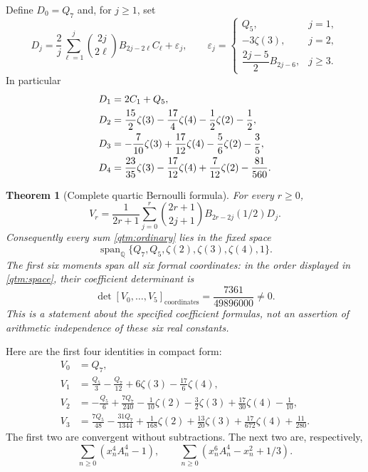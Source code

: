 \documentclass[11pt,a4paper]{article}
\numberwithin{equation}{section}
\theoremstyle{plain}
\newtheorem{theorem}{Theorem}[section]
\theoremstyle{definition}
\theoremstyle{remark}
\begin{document}
Define $D_0=Q_7$ and, for $j\ge1$, set
\begin{equation}\label{qtm:Dj}
 \boxed{\displaystyle
 D_j=\frac2j\sum_{\ell=1}^{j}
 \binom{2j}{2\ell}B_{2j-2\ell}C_\ell+\varepsilon_j,\qquad
 \varepsilon_j=
 \begin{cases}
 Q_5,&j=1,\\
 -3\zeta(3),&j=2,\\
 \dfrac{2j-5}{2}B_{2j-6},&j\ge3.
 \end{cases}}
\end{equation}
In particular
\begin{align}
 D_1&=2C_1+Q_5,\notag\\
 D_2&=\frac{15}{2}\zeta(3)-\frac{17}{4}\zeta(4)
                 -\frac12\zeta(2)-\frac12,\notag\\
 D_3&=-\frac7{10}\zeta(3)+\frac{17}{12}\zeta(4)
                 -\frac56\zeta(2)-\frac35,\notag\\
 D_4&=\frac{23}{35}\zeta(3)-\frac{17}{12}\zeta(4)
                 +\frac7{12}\zeta(2)-\frac{81}{560}.
 \label{qtm:Dexamples}
\end{align}

\begin{theorem}[Complete quartic Bernoulli formula]
\label{qtm:main}
For every $r\ge0$,
\begin{equation}\label{qtm:mainformula}
 \boxed{\displaystyle
 V_r=\frac1{2r+1}\sum_{j=0}^{r}
 \binom{2r+1}{2j+1}B_{2r-2j}(1/2)D_j.}
\end{equation}
Consequently every sum \eqref{qtm:ordinary} lies in the fixed space
\begin{equation}\label{qtm:space}
 \operatorname{span}_{\mathbb Q}
 \{Q_7,Q_5,\zeta(2),\zeta(3),\zeta(4),1\}.
\end{equation}
The first six moments span all six formal coordinates: in the order
displayed in \eqref{qtm:space}, their coefficient determinant is
\begin{equation}\label{qtm:det}
 \det [V_0,\ldots,V_5]_{\mathrm{coordinates}}
       =\frac{7361}{49896000}\ne0.
\end{equation}
This is a statement about the specified coefficient formulas, not an
assertion of arithmetic independence of these six real constants.
\end{theorem}

Here are the first four identities in compact form:
\begin{align}
 V_0&=Q_7,\label{qtm:V0}\\
 V_1&=\frac{Q_5}{3}-\frac{Q_7}{12}
                +6\zeta(3)-\frac{17}{6}\zeta(4),\label{qtm:V1}\\
 V_2&=-\frac{Q_5}{6}+\frac{7Q_7}{240}-\frac1{10}\zeta(2)
        -\frac32\zeta(3)+\frac{17}{30}\zeta(4)-\frac1{10},
        \label{qtm:V2}\\
 V_3&=\frac{7Q_5}{48}-\frac{31Q_7}{1344}+\frac1{168}\zeta(2)
        +\frac{13}{20}\zeta(3)+\frac{17}{672}\zeta(4)
        +\frac{11}{280}.\label{qtm:V3}
\end{align}
The first two are convergent without subtractions.  The next two are,
respectively,
\[
 \sum_{n\ge0}(x_n^4A_n^4-1),\qquad
 \sum_{n\ge0}(x_n^6A_n^4-x_n^2+1/3).
\]
\end{document}
